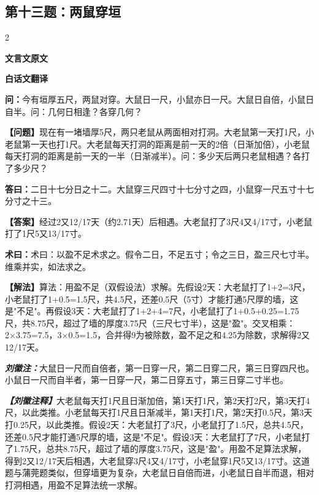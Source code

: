 \documentclass[10pt,a4paper]{article}
\newcommand{\wen}[1]{\textbf{\color{problemcolor}问：}#1\par}
\newcommand{\da}[1]{\textbf{答曰：}#1\par}
\newcommand{\shu}[1]{\textbf{术曰：}#1\par}
\newcommand{\liuhui}[1]{{\color{commentarycolor}\textit{\textbf{刘徽注：}}#1\par}}
\newcommand{\classicalheader}[1]{{\centering\large\bfseries\color{classicalcolor} #1\par\vspace{0.5em}}}
\newcommand{\wenmodern}[1]{\textbf{\color{moderncolor}【问题】}#1\par}
\newcommand{\damodern}[1]{\textbf{【答案】}#1\par}
\newcommand{\shumodern}[1]{\textbf{【解法】}#1\par}
\newcommand{\liuhuimodern}[1]{{\color{commentarycolor}\textit{\textbf{【刘徽注释】}}#1\par}}
\newcommand{\modernheader}[1]{{\centering\large\bfseries\color{moderncolor} #1\par\vspace{0.5em}}}
\newcommand{\problemsec}[1]{\subsection*{#1}}
\begin{document}
\problemsec{第十三题：两鼠穿垣}
\begin{paracol}{2}
\classicalheader{文言文原文}
\switchcolumn
\modernheader{白话文翻译}
\switchcolumn*

\wen{今有垣厚五尺，两鼠对穿。大鼠日一尺，小鼠亦日一尺。大鼠日自倍，小鼠日自半。问：几何日相逢？各穿几何？}

\switchcolumn

\wenmodern{现在有一堵墙厚5尺，两只老鼠从两面相对打洞。大老鼠第一天打1尺，小老鼠第一天也打1尺。大老鼠每天打洞的距离是前一天的2倍（日渐加倍），小老鼠每天打洞的距离是前一天的一半（日渐减半）。问：多少天后两只老鼠相遇？各打了多少尺？}

\switchcolumn*

\da{二日十七分日之十二。大鼠穿三尺四寸十七分寸之四，小鼠穿一尺五寸十七分寸之十三。}

\switchcolumn

\damodern{经过2又12/17天（约2.71天）后相遇。大老鼠打了3尺4又4/17寸，小老鼠打了1尺5又13/17寸。}

\switchcolumn*

\shu{术曰：以盈不足术求之。假令二日，不足五寸；令之三日，盈三尺七寸半。维乘并实，如法求之。}

\switchcolumn

\shumodern{算法：用盈不足（双假设法）求解。先假设2天：大老鼠打了1+2=3尺，小老鼠打了1+0.5=1.5尺，共4.5尺，还差0.5尺（5寸）才能打通5尺厚的墙，这是"不足"。再假设3天：大老鼠打了1+2+4=7尺，小老鼠打了1+0.5+0.25=1.75尺，共8.75尺，超过了墙的厚度3.75尺（三尺七寸半），这是"盈"。交叉相乘：2×3.75=7.5，3×0.5=1.5，合并得9为被除数，盈不足之和4.25为除数，求解得2又12/17天。}

\switchcolumn*

\liuhui{大鼠日一尺而自倍者，第一日穿一尺，第二日穿二尺，第三日穿四尺也。小鼠日一尺而自半者，第一日穿一尺，第二日穿五寸，第三日穿二寸半也。}

\switchcolumn

\liuhuimodern{大老鼠每天打1尺且日渐加倍，第1天打1尺，第2天打2尺，第3天打4尺，以此类推。小老鼠每天打1尺且日渐减半，第1天打1尺，第2天打0.5尺，第3天打0.25尺，以此类推。假设2天：大老鼠打了3尺，小老鼠打了1.5尺，总共4.5尺，还差0.5尺才能打通5尺厚的墙，这是"不足"。假设3天：大老鼠打了7尺，小老鼠打了1.75尺，总共8.75尺，超过了墙的厚度3.75尺，这是"盈"。用盈不足算法求解，得到2又12/17天后相遇，大老鼠穿3尺4又4/17寸，小老鼠穿1尺5又13/17寸。这道题与蒲莞题类似，但穿墙更为复杂，大老鼠日自倍而进，小老鼠日自半而退，相对打洞相遇，用盈不足算法统一求解。}

\end{paracol}
\end{document}
